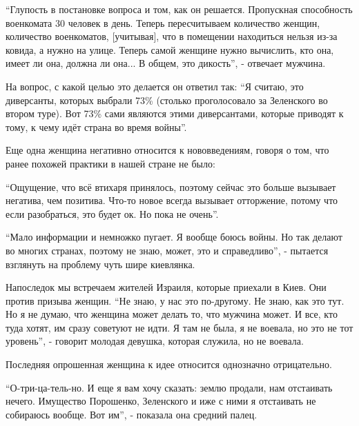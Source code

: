\begin{multicols}{2}

\enquote{Глупость в постановке вопроса и том, как он решается. Пропускная способность
военкомата 30 человек в день. Теперь пересчитываем количество женщин,
количество военкоматов, [учитывая], что в помещении находиться нельзя из-за
ковида, а нужно на улице. Теперь самой женщине нужно вычислить, кто она, имеет
ли она, должна ли она... В общем, это дикость}, - отвечает мужчина. 

На вопрос, с какой целью это делается он ответил так: \enquote{Я считаю, это
диверсанты, которых выбрали 73\% (столько проголосовало за Зеленского во втором
туре). Вот 73\% сами являются этими диверсантами, которые приводят к тому, к
чему идёт страна во время войны}.


Еще одна женщина негативно относится к нововведениям, говоря о том, что ранее
похожей практики в нашей стране не было:

\enquote{Ощущение, что всё втихаря принялось, поэтому сейчас это больше вызывает
негатива, чем позитива. Что-то новое всегда вызывает отторжение, потому что
если разобраться, это будет ок. Но пока не очень}.


\enquote{Мало информации и немножко пугает. Я вообще боюсь войны. Но так делают во
многих странах, поэтому не знаю, может, это и справедливо}, - пытается
взглянуть на проблему чуть шире киевлянка.


Напоследок мы встречаем жителей Израиля, которые приехали в Киев. Они против
призыва женщин. \enquote{Не знаю, у нас это по-другому. Не знаю, как это тут. Но я не
думаю, что женщина может делать то, что мужчина может. И все, кто туда хотят,
им сразу советуют не идти. Я там не была, я не воевала, но это не тот уровень},
- говорит молодая девушка, которая служила, но не воевала.


Последняя опрошенная женщина к идее относится однозначно отрицательно.

\enquote{О-три-ца-тель-но. И еще я вам хочу сказать: землю продали, нам отстаивать
нечего. Имущество Порошенко, Зеленского и иже с ними я отстаивать не собираюсь
вообще. Вот им}, - показала она средний палец.


\end{multicols}
